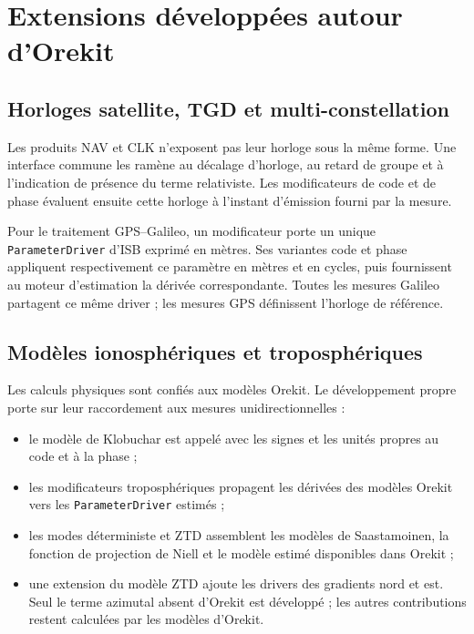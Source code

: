 \section{Extensions développées autour d'Orekit}
\label{sec:orekit_extensions}

\subsection{Horloges satellite, TGD et multi-constellation}

Les produits NAV et CLK n'exposent pas leur horloge sous la même forme. Une
interface commune les ramène au décalage d'horloge, au retard de groupe et à
l'indication de présence du terme relativiste. Les modificateurs de code et de
phase évaluent ensuite cette horloge à l'instant d'émission fourni par la
mesure.

Pour le traitement GPS--Galileo, un modificateur porte un unique
\texttt{ParameterDriver} d'ISB exprimé en mètres. Ses variantes code et phase
appliquent respectivement ce paramètre en mètres et en cycles, puis fournissent
au moteur d'estimation la dérivée correspondante. Toutes les mesures Galileo
partagent ce même driver ; les mesures GPS définissent l'horloge de référence.

\subsection{Modèles ionosphériques et troposphériques}

Les calculs physiques sont confiés aux modèles Orekit. Le développement propre
porte sur leur raccordement aux mesures unidirectionnelles :

\begin{itemize}
    \item le modèle de Klobuchar est appelé avec les signes et les unités
    propres au code et à la phase ;
    \item les modificateurs troposphériques propagent les dérivées des modèles
    Orekit vers les \texttt{ParameterDriver} estimés ;
    \item les modes déterministe et ZTD assemblent les modèles de Saastamoinen,
    la fonction de projection de Niell et le modèle estimé disponibles dans
    Orekit ;
    \item une extension du modèle ZTD ajoute les drivers des gradients nord et
    est. Seul le terme azimutal absent d'Orekit est développé ; les autres
    contributions restent calculées par les modèles d'Orekit.
\end{itemize}


